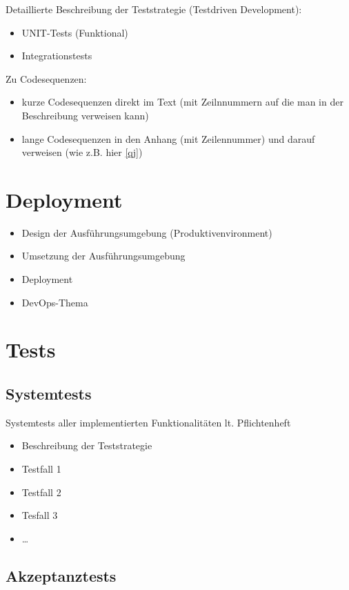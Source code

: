 Detaillierte Beschreibung der Teststrategie (Testdriven Development):

\begin{itemize}
	\item UNIT-Tests (Funktional)
	\item Integrationstests
\end{itemize}

Zu Codesequenzen:
\begin{itemize}
	\item kurze Codesequenzen direkt im Text (mit Zeilnnummern auf die man in der Beschreibung verweisen kann)
	\item lange Codesequenzen in den Anhang (mit Zeilennummer) und darauf verweisen (wie z.B. hier \cref{qj})
\end{itemize}

\chapter{Deployment}
\begin{itemize}
	\item Design der Ausführungsumgebung (Produktivenvironment)
	\item Umsetzung der Ausführungsumgebung
	\item Deployment
	\item DevOps-Thema
\end{itemize}

\chapter{Tests}

\section{Systemtests} 
Systemtests aller implementierten Funktionalitäten lt. Pflichtenheft
\begin{itemize}
	\item Beschreibung der Teststrategie
	\item Testfall 1
	\item Testfall 2
	\item Tesfall 3
	\item …
\end{itemize}

\section{Akzeptanztests}


